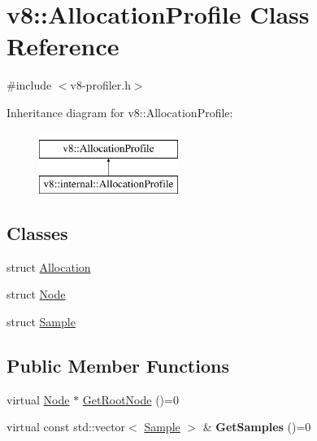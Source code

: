 \hypertarget{classv8_1_1AllocationProfile}{}\section{v8\+:\+:Allocation\+Profile Class Reference}
\label{classv8_1_1AllocationProfile}


{\ttfamily \#include $<$v8-\/profiler.\+h$>$}

Inheritance diagram for v8\+:\+:Allocation\+Profile\+:\begin{figure}[H]
\begin{center}
\leavevmode
\includegraphics[height=2.000000cm]{classv8_1_1AllocationProfile}
\end{center}
\end{figure}
\subsection*{Classes}
\begin{DoxyCompactItemize}
\item 
struct \mbox{\hyperlink{structv8_1_1AllocationProfile_1_1Allocation}{Allocation}}
\item 
struct \mbox{\hyperlink{structv8_1_1AllocationProfile_1_1Node}{Node}}
\item 
struct \mbox{\hyperlink{structv8_1_1AllocationProfile_1_1Sample}{Sample}}
\end{DoxyCompactItemize}
\subsection*{Public Member Functions}
\begin{DoxyCompactItemize}
\item 
virtual \mbox{\hyperlink{structv8_1_1AllocationProfile_1_1Node}{Node}} $\ast$ \mbox{\hyperlink{classv8_1_1AllocationProfile_afea045dae30df5477088e2f0b7edb6c4}{Get\+Root\+Node}} ()=0
\item 
\mbox{\label{classv8_1_1AllocationProfile_a5dae5644e119c5c9ef699e27b98ab92d}} 
virtual const std\+::vector$<$ \mbox{\hyperlink{structv8_1_1AllocationProfile_1_1Sample}{Sample}} $>$ \& {\bfseries Get\+Samples} ()=0
\end{DoxyCompactItemize}
